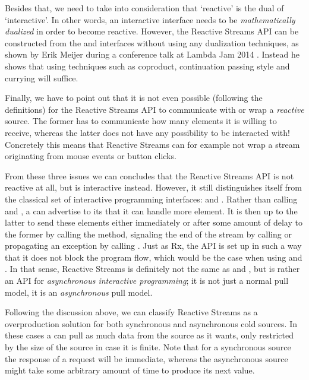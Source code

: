 Besides that, we need to take into consideration that `reactive' is the dual of `interactive'. In other words, an interactive interface needs to be \emph{mathematically dualized} in order to become reactive. However, the Reactive Streams API can be constructed from the \ieb and \ier interfaces without using any dualization techniques, as shown by Erik Meijer during a conference talk at Lambda Jam 2014 \cite{meijer2014-Derivation}. Instead he shows that using techniques such as coproduct, continuation passing style and currying will suffice.

Finally, we have to point out that it is not even possible (following the definitions) for the Reactive Streams API to communicate with or wrap a \emph{reactive} source. The former has to communicate how many elements it is willing to receive, whereas the latter does not have any possibility to be interacted with! Concretely this means that Reactive Streams can for example not wrap a stream originating from mouse events or button clicks.

From these three issues we can concludes that the Reactive Streams API is not reactive at all, but is interactive instead. However, it still distinguishes itself from the classical set of interactive programming interfaces: \ieb and \ier. Rather than calling  and , a  can advertise to its  that it can handle  more element. It is then up to the latter to send these elements either immediately or after some amount of delay to the former by calling the  method, signaling the end of the stream by calling  or propagating an exception by calling . Just as Rx, the API is set up in such a way that it does not block the program flow, which would be the case when using \ieb and \ier. In that sense, Reactive Streams is definitely not the same as \ieb and \ier, but is rather an API for \textit{asynchronous interactive programming}; it is not just a normal pull model, it is an \textit{asynchronous} pull model.

Following the discussion above, we can classify Reactive Streams as a overproduction solution for both synchronous and asynchronous cold sources. In these cases a  can pull as much data from the source as it wants, only restricted by the size of the source in case it is finite. Note that for a synchronous source the response of a request will be immediate, whereas the asynchronous source might take some arbitrary amount of time to produce its next value.

